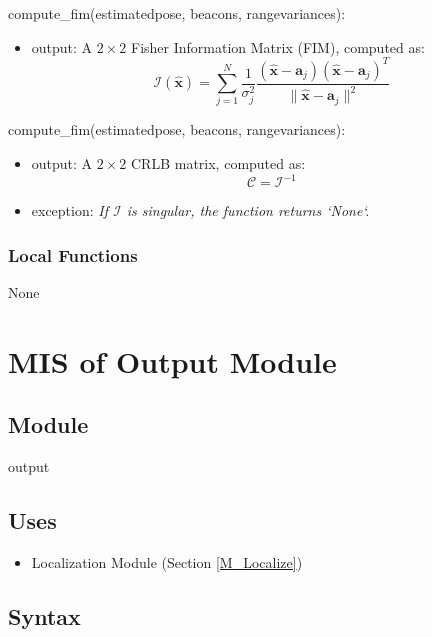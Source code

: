 \documentclass[12pt, titlepage]{article}
\begin{document}
\noindent compute\_fim(estimated\textunderscore pose, beacons, range\textunderscore variances):
\begin{itemize}
\item output: A \( 2 \times 2 \) Fisher Information Matrix (FIM), computed as:
\[
\mathcal{I}(\hat{\mathbf{x}}) = \sum_{j=1}^{N} \frac{1}{\sigma_j^2} \frac{(\hat{\mathbf{x}} - \mathbf{a}_j)(\hat{\mathbf{x}} - \mathbf{a}_j)^T}{\|\hat{\mathbf{x}} - \mathbf{a}_j\|^2}
\]
\end{itemize}

\noindent compute\_fim(estimated\textunderscore pose, beacons, range\textunderscore variances):
\begin{itemize}
\item output: A \( 2 \times 2 \) CRLB matrix, computed as:
\[
\mathcal{C} = \mathcal{I}^{-1}
\]
\item exception: \textit{If \( \mathcal{I} \) is singular, the function returns `None`.}
\end{itemize}

\subsubsection{Local Functions}
None

\newpage

\section{MIS of Output Module} \label{M_Output} 
\subsection{Module}

output

\subsection{Uses}
\begin{itemize}
  \item Localization Module (Section \ref{M_Localize})
\end{itemize}

\subsection{Syntax}
\end{document}
